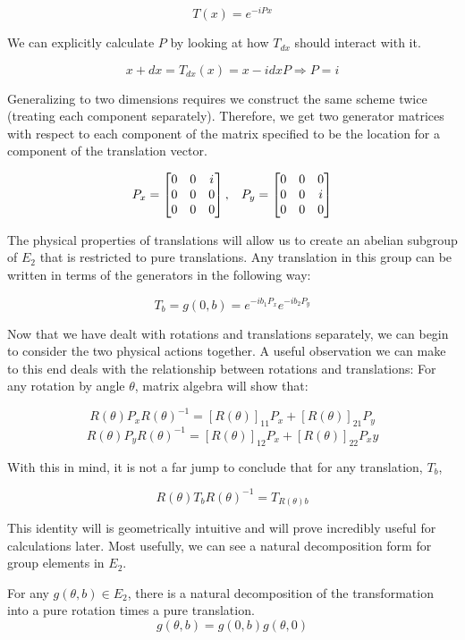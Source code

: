 $$T(x) = e^{-iPx}$$

We can explicitly calculate $P$ by looking at how $T_{dx}$ should interact with it.

$$x + dx = T_{dx}(x) = x -idx  P \Rightarrow P = i$$

Generalizing to two dimensions requires we construct the same scheme twice (treating each component separately). Therefore, we get two generator matrices with respect to each component of the matrix specified to be the location for a component of the translation vector.

$$P_x = \begin{bmatrix}
			0 & 0 & i\\
			0 & 0 & 0 \\
			0 & 0 & 0
		\end{bmatrix}, \hspace{3mm}P_y = \begin{bmatrix}
			0 & 0 & 0\\
			0 & 0 & i \\
			0 & 0 & 0
		\end{bmatrix}$$

The physical properties of translations will allow us to create an abelian subgroup of $E_2$ that is restricted to pure translations. Any translation in this group can be written in terms of the generators in the following way:

$$T_b = g(0,b) = e^{-ib_1P_x}e^{-ib_2P_y}$$

Now that we have dealt with rotations and translations separately, we can begin to consider the two physical actions together. A useful observation we can make to this end deals with the relationship between rotations and translations: For any rotation by angle $\theta$, matrix algebra will show that:

$$R(\theta)P_xR(\theta)^{-1} = [R(\theta)]_{11}P_x +  [R(\theta)]_{21}P_y$$
$$R(\theta)P_yR(\theta)^{-1} = [R(\theta)]_{12}P_x +  [R(\theta)]_{22}P_xy$$

With this in mind, it is not a far jump to conclude that for any translation, $T_b$,

$$R(\theta)T_bR(\theta)^{-1} = T_{R(\theta)b}$$

This identity will is geometrically intuitive and will prove incredibly useful for calculations later. Most usefully, we can see a natural decomposition form for group elements in $E_2$.

\begin{theorem}
	For any $g(\theta,b)\in E_2$, there is a natural decomposition of the transformation into a pure rotation times a pure translation.
$$g(\theta,b) = g(0,b)g(\theta,0)$$
\end{theorem}


